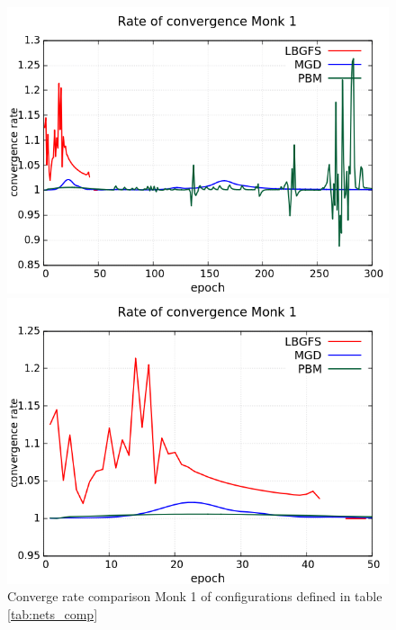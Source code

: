 \begin{figure}[H]
	\centering
	\begin{minipage}[t]{0.5\linewidth}
		\includegraphics[width=\linewidth]{data/Comparison/Monk1/Monk1_CR_standard.png}
	\end{minipage}%
	\begin{minipage}[t]{0.5\linewidth}
		\includegraphics[width=\linewidth]{data/Comparison/Monk1/Monk1_CR_zoom.png}
	\end{minipage}
	\caption{Converge rate comparison Monk 1 of configurations defined in table \ref{tab:nets_comp}}
	\label{CR-Monk1}
\end{figure}
